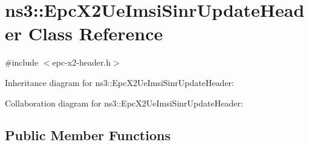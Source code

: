 \hypertarget{classns3_1_1EpcX2UeImsiSinrUpdateHeader}{}\section{ns3\+:\+:Epc\+X2\+Ue\+Imsi\+Sinr\+Update\+Header Class Reference}
\label{classns3_1_1EpcX2UeImsiSinrUpdateHeader}


{\ttfamily \#include $<$epc-\/x2-\/header.\+h$>$}



Inheritance diagram for ns3\+:\+:Epc\+X2\+Ue\+Imsi\+Sinr\+Update\+Header\+:


Collaboration diagram for ns3\+:\+:Epc\+X2\+Ue\+Imsi\+Sinr\+Update\+Header\+:
\subsection*{Public Member Functions}

